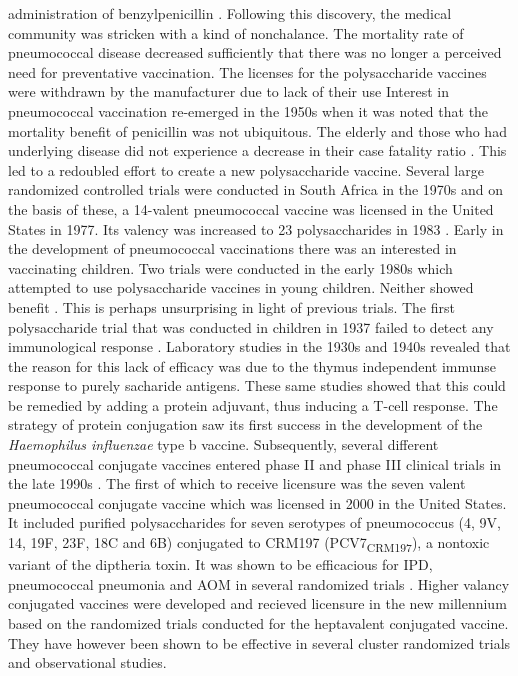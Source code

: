 \documentclass[]{book}
\theoremstyle{definition}
\theoremstyle{definition}
\theoremstyle{definition}
\theoremstyle{remark}
\begin{document}
administration of benzylpenicillin \citep{Tillett1943}. Following this
discovery, the medical community was stricken with a kind of
nonchalance. The mortality rate of pneumococcal disease decreased
sufficiently that there was no longer a perceived need for preventative
vaccination. The licenses for the polysaccharide vaccines were withdrawn
by the manufacturer due to lack of their use \citep{Austrian1999a}
Interest in pneumococcal vaccination re-emerged in the 1950s when it was
noted that the mortality benefit of penicillin was not ubiquitous. The
elderly and those who had underlying disease did not experience a
decrease in their case fatality ratio \citep{Austrian1964}. This led to
a redoubled effort to create a new polysaccharide vaccine. Several large
randomized controlled trials were conducted in South Africa in the 1970s
\citep[\citet{Smit1977}]{Austrian1976} and on the basis of these, a
14-valent pneumococcal vaccine was licensed in the United States in
1977. Its valency was increased to 23 polysaccharides in 1983
\citep{Austrian1999a}. Early in the development of pneumococcal
vaccinations there was an interested in vaccinating children. Two trials
were conducted in the early 1980s which attempted to use polysaccharide
vaccines in young children. Neither showed benefit
\citep{Makela1981, Sloyer1981}. This is perhaps unsurprising in light of
previous trials. The first polysaccharide trial that was conducted in
children in 1937 failed to detect any immunological response
\citep{Davies1937}. Laboratory studies in the 1930s and 1940s revealed
that the reason for this lack of efficacy was due to the thymus
independent immunse response to purely sacharide antigens. These same
studies showed that this could be remedied by adding a protein adjuvant,
thus inducing a T-cell response. The strategy of protein conjugation saw
its first success in the development of the \emph{Haemophilus
influenzae} type b vaccine. Subsequently, several different pneumococcal
conjugate vaccines entered phase II and phase III clinical trials in the
late 1990s \citep{Austrian1999a}. The first of which to receive
licensure was the seven valent pneumococcal conjugate vaccine which was
licensed in 2000 in the United States. It included purified
polysaccharides for seven serotypes of pneumococcus (4, 9V, 14, 19F,
23F, 18C and 6B) conjugated to CRM197 (PCV7\textsubscript{CRM197}), a
nontoxic variant of the diptheria toxin. It was shown to be efficacious
for IPD, pneumococcal pneumonia and AOM in several randomized trials
\citep{Black2000, Black2002c, Eskola2001, Fireman2003, Kilpi2003}.
Higher valancy conjugated vaccines were developed and recieved licensure
in the new millennium based on the randomized trials conducted for the
heptavalent conjugated vaccine. They have however been shown to be
effective in several cluster randomized trials and observational
studies.
\end{document}
